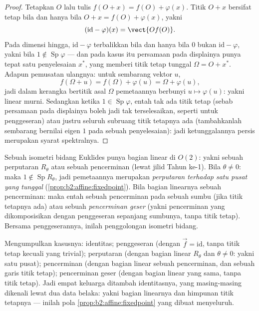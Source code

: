 \begin{proof}
Tetapkan $O$ lalu tulis $f(O + x) = f(O) + \varphi(x)$. Titik
$O + x$ bersifat tetap bila dan hanya bila $O + x = f(O) + \varphi(x)$, yakni
\[
(\mathrm{id} - \varphi)(x) = \vect{O f(O)} .
\]
Pada dimensi hingga, $\mathrm{id} - \varphi$ terbalikkan
bila dan hanya bila $0$ bukan  $\mathrm{id} - \varphi$, yakni bila
$1 \notin \operatorname{Sp}\varphi$ --- dan pada kasus itu
persamaan pada displainya punya tepat satu penyelesaian $x^*$, yang memberi
titik tetap tunggal $\Omega = O + x^*$. Adapun pemusatan ulangnya: untuk sembarang
vektor $u$,
\[
f(\Omega + u) = f(\Omega) + \varphi(u) = \Omega + \varphi(u),
\]
jadi dalam kerangka bertitik asal $\Omega$ pemetaannya berbunyi $u \mapsto
\varphi(u)$: yakni linear murni. Sedangkan ketika $1 \in
\operatorname{Sp}\varphi$, entah tak ada titik tetap (sebab
persamaan pada displainya boleh jadi tak terselesaikan, seperti untuk penggeseran)
atau justru seluruh subruang  titik tetapnya ada (tambahkanlah sembarang 
bernilai eigen $1$ pada sebuah penyelesaian): jadi ketunggalannya persis
merupakan syarat spektralnya.
\end{proof}

\begin{example}\label{ex:b2:affine:isometries}
Sebuah isometri  bidang Euklides punya bagian linear di
$O(2)$: yakni sebuah perputaran $R_\theta$ atau sebuah pencerminan (lewat jilid Tahun ke-1). Bila
$\theta \neq 0$: maka $1 \notin \operatorname{Sp} R_\theta$, jadi pemetaannya
merupakan \emph{perputaran terhadap satu pusat yang tunggal}
(\cref{prop:b2:affine:fixedpoint}). Bila bagian linearnya sebuah
pencerminan: maka entah sebuah pencerminan pada sebuah sumbu (jika titik tetapnya ada) atau
sebuah \emph{pencerminan geser} (yakni pencerminan yang dikomposisikan dengan penggeseran
sepanjang sumbunya, tanpa titik tetap). Bersama penggeserannya, inilah
penggolongan  isometri bidang.
\end{example}

\begin{remark}
Mengumpulkan kasusnya: identitas; penggeseran (dengan $\vec f =
\mathrm{id}$, tanpa titik tetap kecuali yang trivial); perputaran
(dengan bagian linear $R_\theta$ dan $\theta \neq 0$: yakni satu pusat);
pencerminan (dengan bagian linear sebuah pencerminan, dan sebuah garis titik
tetap); pencerminan geser (dengan bagian linear yang sama, tanpa titik
tetap). Jadi empat keluarga ditambah identitasnya, yang masing-masing dikenali lewat
dua data belaka: yakni bagian linearnya dan himpunan titik tetapnya ---
inilah pola \cref{prop:b2:affine:fixedpoint} yang dibuat
menyeluruh.
\end{remark}

